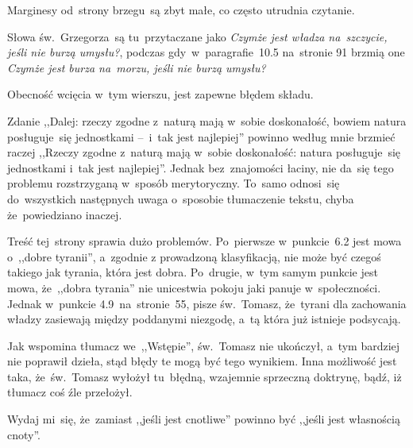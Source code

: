 \documentclass[a4paper,11pt]{article}
\begin{document}
\start Marginesy od~strony brzegu~są zbyt małe, co często utrudnia
czytanie.

\vspace{\spaceFour}


\start {} Słowa św.~Grzegorza~są tu~przytaczane jako
\emph{Czymże jest władza na~szczycie, jeśli nie burzą umysłu?},
podczas gdy~w~paragrafie~10.5 na~stronie 91 brzmią one \emph{Czymże
  jest burza na~morzu, jeśli nie burzą umysłu?}

\vspace{\spaceFour}


\start {} Obecność wcięcia w~tym wierszu, jest zapewne
błędem składu.

\vspace{\spaceFour}


\start {} Zdanie ,,Dalej: rzeczy zgodne z~naturą mają
w~sobie doskonałość, bowiem natura posługuje~się jednostkami --~i~tak
jest najlepiej'' powinno według mnie brzmieć raczej ,,Rzeczy zgodne
z~naturą mają w~sobie doskonałość: natura posługuje~się jednostkami
i~tak jest najlepiej''. Jednak bez~znajomości łaciny, nie da~się tego
problemu rozstrzyganą w~sposób merytoryczny. To~samo odnosi~się
do~wszystkich następnych uwaga o~sposobie tłumaczenie tekstu, chyba
że~powiedziano inaczej.

\vspace{\spaceFour}


\start {} Treść tej~strony sprawia dużo problemów. Po~pierwsze
w~punkcie~6.2 jest mowa o~,,dobre tyranii'', a~zgodnie z prowadzoną
klasyfikacją, nie może być czegoś takiego jak tyrania, która jest
dobra. Po~drugie, w~tym samym punkcie jest mowa, że~,,dobra tyrania''
nie unicestwia pokoju jaki panuje w~społeczności. Jednak w~punkcie
4.9~na~stronie~55, pisze św.~Tomasz, że~tyrani dla zachowania władzy
zasiewają między poddanymi niezgodę, a~tą która już istnieje
podsycają.

Jak wspomina tłumacz we~,,Wstępie'', św.~Tomasz nie ukończył, a~tym
bardziej nie poprawił dzieła, stąd błędy te mogą być tego wynikiem.
Inna możliwość jest taka, że~św.~Tomasz wyłożył tu~błędną, wzajemnie
sprzeczną doktrynę, bądź, iż tłumacz coś źle przełożył.

\vspace{\spaceFour}


\start {} Wydaj mi~się, że~zamiast ,,jeśli jest cnotliwe''
powinno być ,,jeśli jest własnością cnoty''.

\vspace{\spaceFour}
\end{document}
